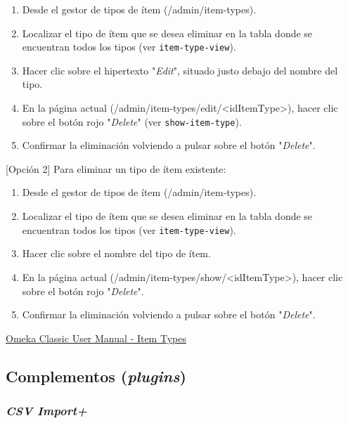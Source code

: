 \documentclass[
]{article}
\providecommand{\tightlist}{%
  \setlength{\itemsep}{0pt}\setlength{\parskip}{0pt}}
\begin{document}
\begin{enumerate}
\def\labelenumi{\arabic{enumi}.}
\tightlist
\item
  Desde el gestor de tipos de ítem ({/admin/item-types}).
\item
  Localizar el tipo de ítem que se desea eliminar en la tabla donde se
  encuentran todos los tipos (ver \texttt{item-type-view}).
\item
  Hacer clic sobre el hipertexto "\emph{Edit}", situado justo debajo del
  nombre del tipo.
\item
  En la página actual
  ({/admin/item-types/edit/\textless idItemType\textgreater{}}), hacer
  clic sobre el botón rojo "\emph{Delete}" (ver
  \texttt{show-item-type}).
\item
  Confirmar la eliminación volviendo a pulsar sobre el botón
  "\emph{Delete}".
\end{enumerate}

{[}Opción 2{]} Para eliminar un tipo de ítem existente:

\begin{enumerate}
\def\labelenumi{\arabic{enumi}.}
\tightlist
\item
  Desde el gestor de tipos de ítem ({/admin/item-types}).
\item
  Localizar el tipo de ítem que se desea eliminar en la tabla donde se
  encuentran todos los tipos (ver \texttt{item-type-view}).
\item
  Hacer clic sobre el nombre del tipo de ítem.
\item
  En la página actual
  ({/admin/item-types/show/\textless idItemType\textgreater{}}), hacer
  clic sobre el botón rojo "\emph{Delete}".
\item
  Confirmar la eliminación volviendo a pulsar sobre el botón
  "\emph{Delete}".
\end{enumerate}

\href{https://omeka.org/classic/docs/Content/Item_Types/}{Omeka Classic
User Manual - Item Types}

\hypertarget{complementos-plugins}{%
\subsection{\texorpdfstring{Complementos
(\emph{plugins})}{Complementos (plugins)}}\label{complementos-plugins}}

\hypertarget{csv-import}{%
\subsubsection{\texorpdfstring{\emph{CSV
Import+}}{CSV Import+}}\label{csv-import}}
\end{document}
